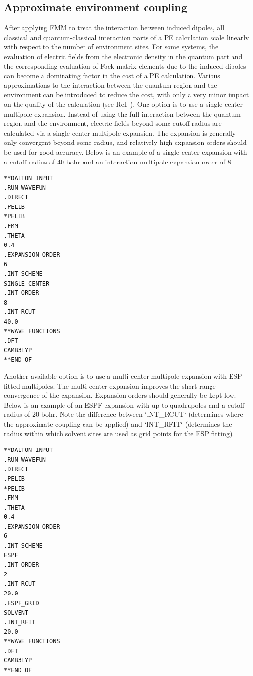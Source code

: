 \subsection{Approximate environment coupling}
After applying FMM to treat the interaction between induced dipoles, all
classical and quantum-classical interaction parts of a PE calculation scale
linearly with respect to the number of environment sites. For some systems,
the evaluation of electric fields from the electronic density in the quantum
part and the corresponding evaluation of Fock matrix elements due to the
induced dipoles can become a dominating factor in the cost of a PE calculation.
Various approximations to the interaction between the quantum region and the
environment can be introduced to reduce the cost, with only a very minor impact
on the quality of the calculation (see Ref. ). One
option is to use a single-center multipole expansion. Instead of using the full
interaction between the quantum region and the environment, electric fields
beyond some cutoff radius are calculated via a single-center multipole expansion.
The expansion is generally only convergent beyond some radius, and relatively
high expansion orders should be used for good accuracy. Below is an example of
a single-center expansion with a cutoff radius of 40 bohr and an interaction
multipole expansion order of 8.

\begin{verbatim}
**DALTON INPUT
.RUN WAVEFUN
.DIRECT
.PELIB
*PELIB
.FMM
.THETA
0.4
.EXPANSION_ORDER
6
.INT_SCHEME
SINGLE_CENTER
.INT_ORDER
8
.INT_RCUT
40.0
**WAVE FUNCTIONS
.DFT
CAMB3LYP
**END OF
\end{verbatim}

Another available option is to use a multi-center multipole expansion with
ESP-fitted multipoles. The multi-center expansion improves the short-range
convergence of the expansion. Expansion orders should generally be kept low.
Below is an example of an ESPF expansion with up to quadrupoles and a cutoff
radius of 20 bohr. Note the difference between `INT\_RCUT` (determines where
the approximate coupling can be applied) and `INT\_RFIT` (determines the
radius within which solvent sites are used as grid points for the ESP fitting).

\begin{verbatim}
**DALTON INPUT
.RUN WAVEFUN
.DIRECT
.PELIB
*PELIB
.FMM
.THETA
0.4
.EXPANSION_ORDER
6
.INT_SCHEME
ESPF
.INT_ORDER
2
.INT_RCUT
20.0
.ESPF_GRID
SOLVENT
.INT_RFIT
20.0
**WAVE FUNCTIONS
.DFT
CAMB3LYP
**END OF
\end{verbatim}

